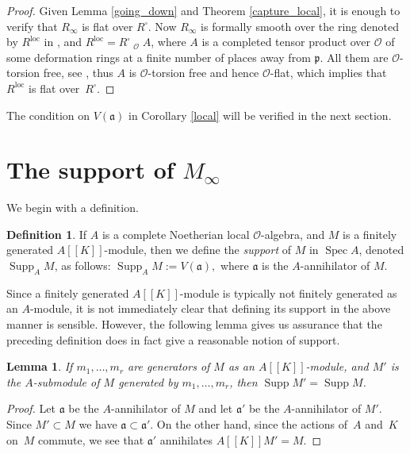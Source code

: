 \documentclass[11pt]{article}
\let\mathcal\mathscr
\newcommand{\ssquare}{{\scriptscriptstyle\square}}
\newtheorem{lem}[prop]{Lemma}
\theoremstyle{definition}
\newtheorem{defi}[prop]{Definition}
\DeclareMathOperator{\Spec}{Spec}
\DeclareMathOperator{\supp}{Supp}
\DeclareMathOperator{\wtimes}{\widehat{\otimes}}
\newcommand{\br}[1]{[\![#1]\!]}
\newcommand{\cO}{\mathcal{O}}
\newcommand{\pp}{\mathfrak p}
\newcommand{\loc}{\mathrm{loc}}
\begin{document}
\begin{proof} Given Lemma \ref{going_down} and Theorem \ref{capture_local}, it is enough to verify that $R_{\infty}$ is flat over $R^\ssquare$. Now
$R_{\infty}$ is formally smooth over the ring denoted by $R^{\loc}$ in \cite[\S 2.6]{six-authors}, and $R^{\loc}= R^\ssquare \wtimes_{\cO} A$, where
$A$ is a completed tensor product over $\cO$ of some deformation rings at a finite number of places away from $\pp$. All them are $\cO$-torsion free, see
\hbox{\cite[\S 2.4]{six-authors}}, thus $A$ is $\cO$-torsion free and hence $\cO$-flat, which implies that $R^{\loc}$ is flat over~$R^\ssquare$.
\end{proof}

The condition on $V(\mathfrak a)$ in Corollary \ref{local} will be verified in the next section.

\section{The support of \texorpdfstring{$M_{\infty}$}{Minf}}\label{support}
We begin with a definition.

\begin{defi}\label{define_support} If $A$ is a complete Noetherian
local $\cO$-algebra,
and $M$ is a finitely generated $A\br{K}$-module,
then we define the {\em support} of $M$ in $\Spec A$, denoted
$\supp_A M$, as follows:
$\supp_A M:= V(\mathfrak a),$
where $\mathfrak a$ is the $A$-annihilator of $M$.
\end{defi}

Since a finitely generated $A\br{K}$-module is typically not finitely generated
as an $A$\nobreakdash-module, it is not immediately clear that defining its support
in the above manner is sensible. However, the following lemma gives
us assurance that the preceding definition does in fact give a reasonable
notion of support.

\begin{lem}\label{all_finite} If $m_1, \ldots, m_r$ are generators of $M$
as an $A\br{K}$-module, and $M'$ is the $A$-submodule
of $M$ generated by $m_1, \ldots, m_r$,
then $\supp M'=\supp M$.
\end{lem}

\begin{proof} Let $\mathfrak a$ be the $A$-annihilator of $M$ and let $\mathfrak a'$ be the $A$-annihilator of $M'$. Since $M'\subset M$
we have $\mathfrak a\subset \mathfrak a'$.
On the other hand, since the actions of~$A$ and~$K$ on~$M$ commute,
we see that $\mathfrak a'$ annihilates $A\br{K}M' = M.$
\end{proof}
\end{document}
